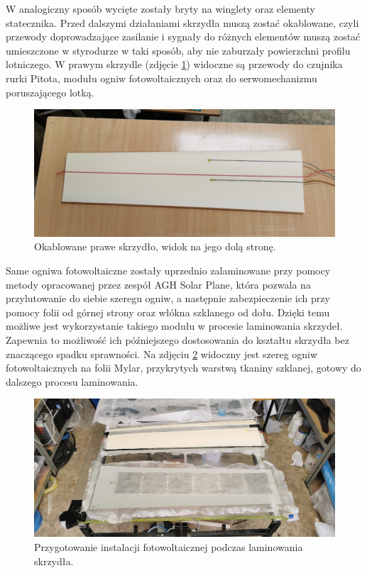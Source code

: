 \documentclass[12pt, a4paper]{article}
\begin{document}
W analogiczny sposób wycięte zostały bryty na winglety oraz elementy statecznika. Przed dalszymi działaniami skrzydła muszą zostać okablowane, czyli przewody doprowadzające zasilanie i sygnały do różnych elementów muszą zostać umieszczone w styrodurze w taki sposób, aby nie zaburzały powierzchni profilu lotniczego. W prawym skrzydle (zdjęcie \ref{fig:okablowane}) widoczne są przewody do czujnika rurki Pitota, modułu ogniw fotowoltaicznych oraz do serwomechanizmu poruszającego lotką.

 \begin{figure}[ht]
    \centering
    \includegraphics[width=1\textwidth]{okablowany}
    \caption{Okablowane prawe skrzydło, widok na jego dolą stronę.}
    \label{fig:okablowane}
\end{figure}

Same ogniwa fotowoltaiczne zostały uprzednio zalaminowane przy pomocy metody opracowanej przez zespół AGH Solar Plane, która pozwala na przylutowanie do siebie szeregu ogniw, a następnie zabezpieczenie ich przy pomocy folii od górnej strony oraz włókna szklanego od dołu. Dzięki temu możliwe jest wykorzystanie takiego modułu w procesie laminowania skrzydeł. Zapewnia to możliwość ich późniejszego dostosowania do kształtu skrzydła bez znaczącego spadku sprawności. Na zdjęciu \ref{fig:laminowanie} widoczny jest szereg ogniw fotowoltaicznych na folii Mylar, przykrytych warstwą tkaniny szklanej, gotowy do dalszego procesu laminowania.

 \begin{figure}[ht]
    \centering
    \includegraphics[width=1\textwidth]{budowa7}
    \caption{Przygotowanie instalacji fotowoltaicznej podczas laminowania skrzydła.}
    \label{fig:laminowanie}
\end{figure}
\end{document}
